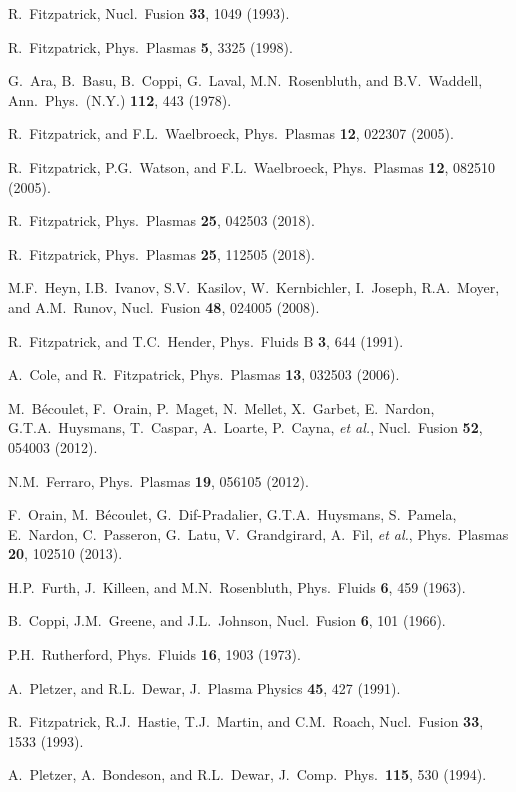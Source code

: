 \documentclass[12pt,prb,aps]{revtex4-1}
\begin{document}
\begin{thebibliography}{99}
 R.~Fitzpatrick, Nucl.\ Fusion {\bf 33}, 1049 (1993).

 R.~Fitzpatrick, Phys.\ Plasmas {\bf 5}, 3325 (1998).

 G.~Ara,  B.~Basu, B.~Coppi, G.~Laval, M.N.~Rosenbluth, and B.V.~Waddell, Ann.\ Phys.\ (N.Y.) {\bf 112}, 443 (1978). 

 R.~Fitzpatrick, and F.L.~Waelbroeck, Phys.\ Plasmas {\bf 12}, 022307 (2005).

 R.~Fitzpatrick, P.G.~Watson, and F.L.~Waelbroeck, Phys.\ Plasmas {\bf 12}, 082510 (2005).

 R.~Fitzpatrick, Phys.\ Plasmas {\bf 25}, 042503 (2018).

 R.~Fitzpatrick, Phys.\ Plasmas {\bf 25}, 112505 (2018).

 M.F.~Heyn, I.B.~Ivanov, S.V.~Kasilov, W.~Kernbichler, I.~Joseph, R.A.~Moyer,  and A.M.~Runov, Nucl.\ Fusion {\bf 48}, 024005 (2008). 

 R.~Fitzpatrick, and T.C.~Hender, Phys.\ Fluids B {\bf 3}, 644 (1991).

 A.~Cole, and R.~Fitzpatrick, Phys.\ Plasmas {\bf 13}, 032503 (2006).

 M.~B\'{e}coulet, F.~Orain, P.~Maget, N.~Mellet, X.~Garbet, E.~Nardon, G.T.A.~Huysmans, T.~Caspar, A.~Loarte,  P.~Cayna, {\em et al.}, 
Nucl.\ Fusion {\bf 52}, 054003  (2012).

 N.M.~Ferraro, Phys.\ Plasmas {\bf 19}, 056105  (2012).

 F.~Orain, M.~B\'{e}coulet, G.~Dif-Pradalier, G.T.A.~Huysmans, S.~Pamela,   E.~Nardon, C.~Passeron, G.~Latu, V.~Grandgirard, A.~Fil, {\em et al.}, 
Phys.\ Plasmas {\bf 20}, 102510 (2013). 

 H.P.~Furth,  J.~Killeen, and M.N.~Rosenbluth,  Phys.\ Fluids {\bf 6}, 459 (1963).

 B.~Coppi, J.M.~Greene, and J.L.~Johnson, Nucl.\ Fusion {\bf 6}, 101 (1966).

 P.H.~Rutherford,  Phys.\ Fluids  {\bf 16}, 1903 (1973).

 A.~Pletzer, and R.L.~Dewar, J.\ Plasma Physics {\bf 45}, 427 (1991).

 R.~Fitzpatrick, R.J.~Hastie, T.J.~Martin, and C.M.~Roach, Nucl.\ Fusion {\bf 33}, 1533 (1993).

 A.~Pletzer, A.~Bondeson, and R.L.~Dewar, J.\ Comp.\ Phys.\ {\bf 115}, 530 (1994).


\end{thebibliography}
\end{document}
